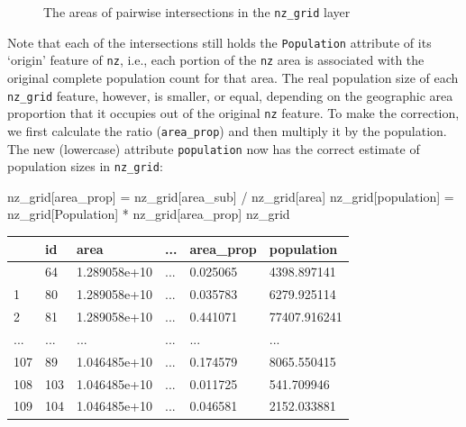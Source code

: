 \documentclass[
  letterpaper,
]{krantz}
\newenvironment{Shaded}{\begin{snugshade}}{\end{snugshade}}
\newcommand{\NormalTok}[1]{\textcolor[rgb]{0.00,0.23,0.31}{#1}}
\newcommand{\OperatorTok}[1]{\textcolor[rgb]{0.37,0.37,0.37}{#1}}
\newcommand{\StringTok}[1]{\textcolor[rgb]{0.13,0.47,0.30}{#1}}
\begin{document}
\begin{figure}[H]


\caption{\label{fig-nz-and-grid2}The areas of pairwise intersections in
the \texttt{nz\_grid} layer}

\end{figure}%

Note that each of the intersections still holds the \texttt{Population}
attribute of its `origin' feature of \texttt{nz}, i.e., each portion of
the \texttt{nz} area is associated with the original complete population
count for that area. The real population size of each \texttt{nz\_grid}
feature, however, is smaller, or equal, depending on the geographic area
proportion that it occupies out of the original \texttt{nz} feature. To
make the correction, we first calculate the ratio (\texttt{area\_prop})
and then multiply it by the population. The new (lowercase) attribute
\texttt{population} now has the correct estimate of population sizes in
\texttt{nz\_grid}:

\begin{Shaded}
\begin{Highlighting}[]
\NormalTok{nz\_grid[}\StringTok{\textquotesingle{}area\_prop\textquotesingle{}}\NormalTok{] }\OperatorTok{=}\NormalTok{ nz\_grid[}\StringTok{\textquotesingle{}area\_sub\textquotesingle{}}\NormalTok{] }\OperatorTok{/}\NormalTok{ nz\_grid[}\StringTok{\textquotesingle{}area\textquotesingle{}}\NormalTok{]}
\NormalTok{nz\_grid[}\StringTok{\textquotesingle{}population\textquotesingle{}}\NormalTok{] }\OperatorTok{=}\NormalTok{ nz\_grid[}\StringTok{\textquotesingle{}Population\textquotesingle{}}\NormalTok{] }\OperatorTok{*}\NormalTok{ nz\_grid[}\StringTok{\textquotesingle{}area\_prop\textquotesingle{}}\NormalTok{]}
\NormalTok{nz\_grid}
\end{Highlighting}
\end{Shaded}

\begin{longtable}[]{@{}llllll@{}}
\toprule\noalign{}
& id & area & ... & area\_prop & population \\
\midrule\noalign{}
\endhead
\bottomrule\noalign{}
\endlastfoot
0 & 64 & 1.289058e+10 & ... & 0.025065 & 4398.897141 \\
1 & 80 & 1.289058e+10 & ... & 0.035783 & 6279.925114 \\
2 & 81 & 1.289058e+10 & ... & 0.441071 & 77407.916241 \\
... & ... & ... & ... & ... & ... \\
107 & 89 & 1.046485e+10 & ... & 0.174579 & 8065.550415 \\
108 & 103 & 1.046485e+10 & ... & 0.011725 & 541.709946 \\
109 & 104 & 1.046485e+10 & ... & 0.046581 & 2152.033881 \\
\end{longtable}
\end{document}
